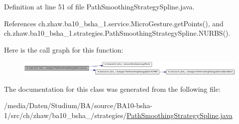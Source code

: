 Definition at line 51 of file PathSmoothingStrategySpline.java.

References ch.zhaw.ba10\_\-bsha\_\-1.service.MicroGesture.getPoints(), and ch.zhaw.ba10\_\-bsha\_\-1.strategies.PathSmoothingStrategySpline.NURBS().

Here is the call graph for this function:\nopagebreak
\begin{figure}[H]
\begin{center}
\leavevmode
\includegraphics[width=420pt]{classch_1_1zhaw_1_1ba10__bsha__1_1_1strategies_1_1PathSmoothingStrategySpline_ad3e6346b66b88e50ce7c985ff3d99644_cgraph}
\end{center}
\end{figure}


The documentation for this class was generated from the following file:\begin{DoxyCompactItemize}
\item 
/media/Daten/Studium/BA/source/BA10-\/bsha-\/1/src/ch/zhaw/ba10\_\-bsha\_/strategies/\hyperlink{PathSmoothingStrategySpline_8java}{PathSmoothingStrategySpline.java}\end{DoxyCompactItemize}
